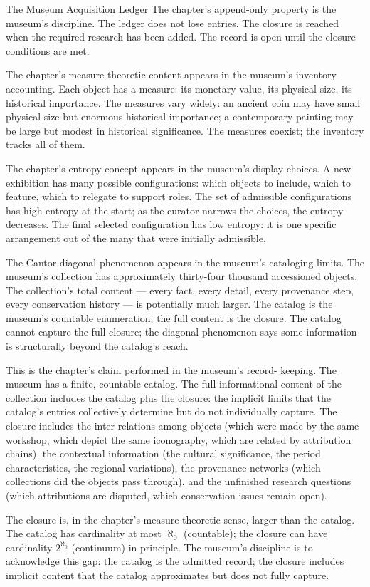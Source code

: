 \begin{coda}{The Museum Acquisition Ledger}
The chapter's append-only property is the museum's discipline. The
ledger does not lose entries. The closure is reached when the
required research has been added. The record is open until the
closure conditions are met.

The chapter's measure-theoretic content appears in the museum's
inventory accounting. Each object has a measure: its monetary
value, its physical size, its historical importance. The
measures vary widely: an ancient coin may have small physical
size but enormous historical importance; a contemporary
painting may be large but modest in historical significance.
The measures coexist; the inventory tracks all of them.

The chapter's entropy concept appears in the museum's display
choices. A new exhibition has many possible configurations: which
objects to include, which to feature, which to relegate to support
roles. The set of admissible configurations has high entropy at
the start; as the curator narrows the choices, the entropy
decreases. The final selected configuration has low entropy: it
is one specific arrangement out of the many that were initially
admissible.

The Cantor diagonal phenomenon appears in the museum's
cataloging limits. The museum's collection has approximately
thirty-four thousand accessioned objects. The collection's
total content --- every fact, every detail, every provenance step,
every conservation history --- is potentially much larger. The
catalog is the museum's countable enumeration; the full content
is the closure. The catalog cannot capture the full closure; the
diagonal phenomenon says some information is structurally
beyond the catalog's reach.

This is the chapter's claim performed in the museum's record-
keeping. The museum has a finite, countable catalog. The full
informational content of the collection includes the catalog plus
the closure: the implicit limits that the catalog's entries
collectively determine but do not individually capture. The
closure includes the inter-relations among objects (which were
made by the same workshop, which depict the same iconography,
which are related by attribution chains), the contextual
information (the cultural significance, the period
characteristics, the regional variations), the provenance
networks (which collections did the objects pass through), and
the unfinished research questions (which attributions are
disputed, which conservation issues remain open).

The closure is, in the chapter's measure-theoretic sense, larger
than the catalog. The catalog has cardinality at most
$\aleph_0$ (countable); the closure can have cardinality
$2^{\aleph_0}$ (continuum) in principle. The museum's
discipline is to acknowledge this gap: the catalog is the
admitted record; the closure includes implicit content that
the catalog approximates but does not fully capture.


\end{coda}
